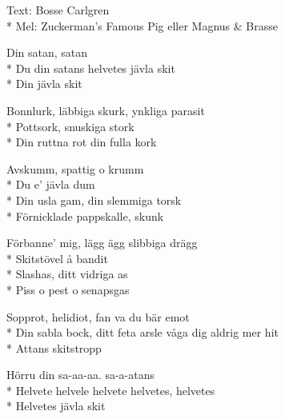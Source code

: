 \begin{SongText}[Svordomsvisan]
    \begin{SongInfo}
        Text: Bosse Carlgren\\*%
        Mel: Zuckerman’s Famous Pig eller Magnus \& Brasse
    \end{SongInfo}
    \begin{SongVerse}
        Din satan, satan\\*%
        Du din satans helvetes jävla skit\\*%
        Din jävla skit
    \end{SongVerse}
    \begin{SongVerse}
        Bonnlurk, läbbiga skurk, ynkliga parasit\\*%
        Pottsork, snuskiga stork\\*%
        Din ruttna rot din fulla kork
    \end{SongVerse}
    \begin{SongVerse}
        Avskumm, spattig o krumm\\*%
        Du e’ jävla dum\\*%
        Din usla gam, din slemmiga torsk\\*%
        Förnicklade pappskalle, skunk
    \end{SongVerse}
    \begin{SongVerse}
        Förbanne' mig, lägg ägg slibbiga drägg\\*%
        Skitstövel å bandit\\*%
        Slashas, ditt vidriga as\\*%
        Piss o pest o senapsgas
    \end{SongVerse}
    \begin{SongVerse}
        Sopprot, helidiot, fan va du bär emot\\*%
        Din sabla bock, ditt feta arsle våga dig aldrig mer hit\\*%
        Attans skitstropp
    \end{SongVerse}
    \begin{SongVerse}
        Hörru din sa-aa-aa. sa-a-atans\\*%
        Helvete helvele helvete helvetes, helvetes\\*%
        Helvetes jävla skit
    \end{SongVerse}
\end{SongText}
